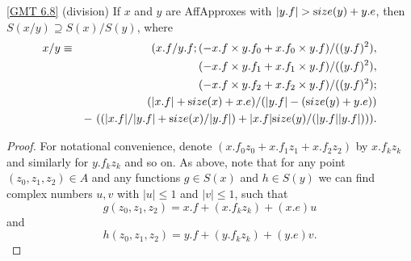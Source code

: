 {\begin{proposition}{\ref{GMT 6.8} {\textrm (division)}} If $x$ and $y$ are {\textrm AffApproxes}  with $|y.f| > {\textrm size}(y) + y.e${\textrm ,}
 then $S(x / y) \supseteq
S(x) / S(y)${\textrm ,} where
\begin{eqnarray*}
x / y &\equiv& (x.f / y.f; (-x.f \times y.f_0 + x.f_0 \times y.f)/((y.f)^2),\\&&\qquad  
(-x.f \times y.f_1 + x.f_1 \times y.f)/((y.f)^2), 
\\
&&\qquad 
(-x.f \times y.f_2 + x.f_2 \times y.f)/((y.f)^2); 
\\
&&\qquad (|x.f| + {\textrm size}(x) + x.e) /(|y.f| - ({\textrm size}(y) + y.e))\\
&&  - \
((|x.f|/|y.f| + {\textrm size}(x)/|y.f|) + |x.f| {\textrm size}(y)/(|y.f||y.f|))).
                                           \end{eqnarray*}
\end{proposition}

\begin{proof}{} 
For notational convenience, denote $(x.f_0 z_0 + x.f_1 z_1 + x.f_2 z_2)$ by $x.f_k z_k$ and similarly for $y.f_k z_k$ and so on.
As above, note that for any point $(z_0, z_1, z_2) \in A$ and any functions $g \in S(x)$ and $h \in S(y)$ we can find complex numbers $u, v$ with $|u| \le 1$ and $|v| \le 1$, such that
$$ g(z_0, z_1, z_2) = x.f + (x.f_k z_k) + (x.e) u$$ and 
$$ h(z_0, z_1, z_2) = y.f + (y.f_k z_k) + (y.e) v.$$ 


\end{proof}}
